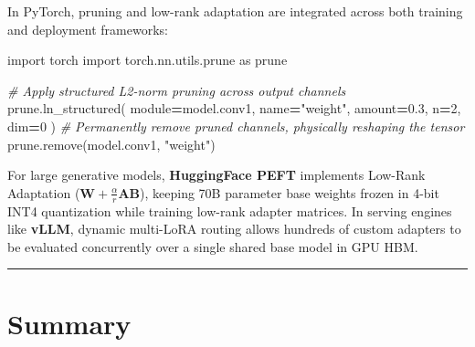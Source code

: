 \documentclass[
  letterpaper,
]{scrbook}
\newenvironment{Shaded}{\begin{snugshade}}{\end{snugshade}}
\newcommand{\CommentTok}[1]{\textcolor[rgb]{0.56,0.35,0.01}{\textit{#1}}}
\newcommand{\DecValTok}[1]{\textcolor[rgb]{0.00,0.00,0.81}{#1}}
\newcommand{\FloatTok}[1]{\textcolor[rgb]{0.00,0.00,0.81}{#1}}
\newcommand{\ImportTok}[1]{#1}
\newcommand{\NormalTok}[1]{#1}
\newcommand{\OperatorTok}[1]{\textcolor[rgb]{0.81,0.36,0.00}{\textbf{#1}}}
\newcommand{\StringTok}[1]{\textcolor[rgb]{0.31,0.60,0.02}{#1}}
\begin{document}
\begin{tcolorbox}[enhanced jigsaw, arc=.35mm, bottomrule=.15mm, bottomtitle=1mm, breakable, colback=white, colbacktitle=quarto-callout-note-color!10!white, colframe=quarto-callout-note-color-frame, coltitle=black, left=2mm, leftrule=.75mm, opacityback=0, opacitybacktitle=0.6, rightrule=.15mm, title=\textcolor{quarto-callout-note-color}{\faInfo}\hspace{0.5em}{PyTorch Systems Bridge: \texttt{torch.nn.utils.prune}, TensorRT, and
PEFT LoRA}, titlerule=0mm, toprule=.15mm, toptitle=1mm]

In PyTorch, pruning and low-rank adaptation are integrated across both
training and deployment frameworks:

\begin{Shaded}
\begin{Highlighting}[]
\ImportTok{import}\NormalTok{ torch}
\ImportTok{import}\NormalTok{ torch.nn.utils.prune }\ImportTok{as}\NormalTok{ prune}

\CommentTok{\# Apply structured L2{-}norm pruning across output channels}
\NormalTok{prune.ln\_structured(}
\NormalTok{    module}\OperatorTok{=}\NormalTok{model.conv1,}
\NormalTok{    name}\OperatorTok{=}\StringTok{"weight"}\NormalTok{,}
\NormalTok{    amount}\OperatorTok{=}\FloatTok{0.3}\NormalTok{,}
\NormalTok{    n}\OperatorTok{=}\DecValTok{2}\NormalTok{,}
\NormalTok{    dim}\OperatorTok{=}\DecValTok{0}
\NormalTok{)}
\CommentTok{\# Permanently remove pruned channels, physically reshaping the tensor}
\NormalTok{prune.remove(model.conv1, }\StringTok{"weight"}\NormalTok{)}
\end{Highlighting}
\end{Shaded}

For large generative models, \textbf{HuggingFace PEFT} implements
Low-Rank Adaptation
(\(\mathbf{W} + \frac{\alpha}{r} \mathbf{A}\mathbf{B}\)), keeping 70B
parameter base weights frozen in 4-bit INT4 quantization while training
low-rank adapter matrices. In serving engines like \textbf{vLLM},
dynamic multi-LoRA routing allows hundreds of custom adapters to be
evaluated concurrently over a single shared base model in GPU HBM.

\end{tcolorbox}

\begin{center}\rule{0.5\linewidth}{0.5pt}\end{center}

\section{Summary}\label{summary-16}
\end{document}
